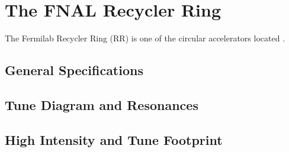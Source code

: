 \chapter{The FNAL Recycler Ring}
The Fermilab Recycler Ring (RR) is one of the circular accelerators located .

\section{General Specifications}

\section{Tune Diagram and Resonances}

\section{High Intensity and Tune Footprint}
